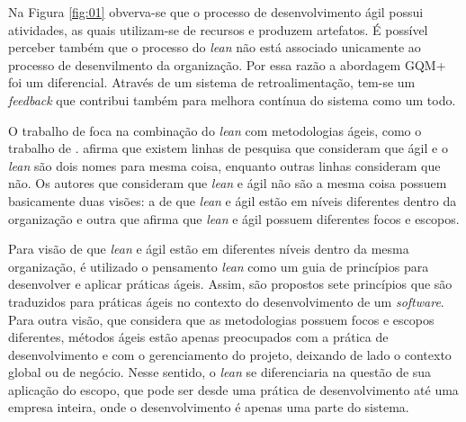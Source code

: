 Na Figura \ref{fig:01} obverva-se que o processo de desenvolvimento ágil possui atividades, as quais utilizam-se de recursos e produzem artefatos. É possível perceber também que o processo do \textit{lean} não está associado unicamente ao processo de desenvilmento da organização. Por essa razão a abordagem GQM+ foi um diferencial. Através de um sistema de retroalimentação, tem-se um \textit{feedback} que contribui também para melhora contínua do sistema como um todo.

O trabalho de  foca na combinação do \textit{lean} com metodologias ágeis, como o trabalho de .  afirma que existem linhas de pesquisa que consideram que ágil e o \textit{lean} são dois nomes para mesma coisa, enquanto outras linhas consideram que não. Os autores que consideram que \textit{lean} e ágil não são a mesma coisa possuem basicamente duas visões: a de que \textit{lean} e ágil estão em níveis diferentes dentro da organização e outra que afirma que \textit{lean} e ágil possuem diferentes focos e escopos. \cite{6005500}




Para visão de que \textit{lean} e ágil estão em diferentes níveis dentro da mesma organização, é utilizado o pensamento \textit{lean} como um guia de princípios para desenvolver e aplicar práticas ágeis. Assim, são propostos sete princípios que são traduzidos para práticas ágeis no contexto do desenvolvimento de um \textit{software}. Para outra visão, que considera que as metodologias possuem focos e escopos diferentes, métodos ágeis estão apenas preocupados com a prática de desenvolvimento e com o gerenciamento do projeto, deixando de lado o contexto global ou de negócio. Nesse sentido, o \textit{lean} se diferenciaria na questão de sua aplicação do escopo, que pode ser desde uma prática de desenvolvimento até uma empresa inteira, onde o desenvolvimento é apenas uma parte do sistema. \cite{6005500}

